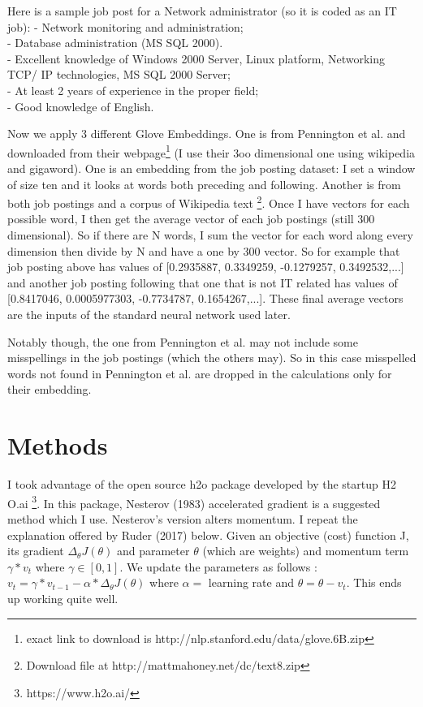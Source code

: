 \documentclass[11pt, oneside]{article}   	%
\begin{document}
Here is a sample job post for a Network administrator (so it is coded as an IT job):
- Network monitoring and administration;\\- Database administration (MS SQL 2000).\\
- Excellent knowledge of Windows 2000 Server, Linux platform, Networking\\TCP/ IP technologies, MS SQL 2000 Server;\\- At least 2 years of experience in the proper field;\\- Good knowledge of English.

Now we apply 3 different Glove Embeddings. One is from Pennington et al. and downloaded from their webpage\footnote{exact link to download is http://nlp.stanford.edu/data/glove.6B.zip} (I use their 3oo dimensional one using wikipedia and gigaword). One is an embedding from the job posting dataset: I set a window of size ten and it looks at words both preceding and following. Another is from both job postings and a corpus of Wikipedia text \footnote{Download file at http://mattmahoney.net/dc/text8.zip}. Once I have vectors for each possible word, I then get the average vector of each job postings (still 300 dimensional).  So if there are N words, I sum the vector for each word along every dimension then divide by N and have a one by 300 vector. So for example that job posting above has values of [0.2935887, 0.3349259, -0.1279257, 0.3492532,...] and another job posting following that one that is not IT related has values of [0.8417046, 0.0005977303, -0.7734787, 0.1654267,...]. These final average vectors are the inputs of the standard neural network used later.

Notably though, the one from Pennington et al. may not include some misspellings in the job postings (which the others may). So in this case misspelled words not found in Pennington et al. are dropped in the calculations only for their embedding.

\section{Methods}

I took advantage of the open source h2o package developed by the startup H2
O.ai \footnote{https://www.h2o.ai/}. In this package, Nesterov (1983) accelerated gradient is a suggested method which I use. Nesterov's version alters momentum. I repeat the explanation offered by Ruder (2017) below. Given an objective (cost) function J, its gradient $\Delta_\theta J(\theta)$ and parameter $\theta$ (which are weights) and momentum term $\gamma * v_t$ where $\gamma \in [0,1]$. We update the parameters as follows : $v_t =\gamma *v_{t-1} - \alpha  * \Delta_\theta J(\theta)$ where $\alpha=$ learning rate and $\theta = \theta - v_t$. This ends up working quite well.
\end{document}
